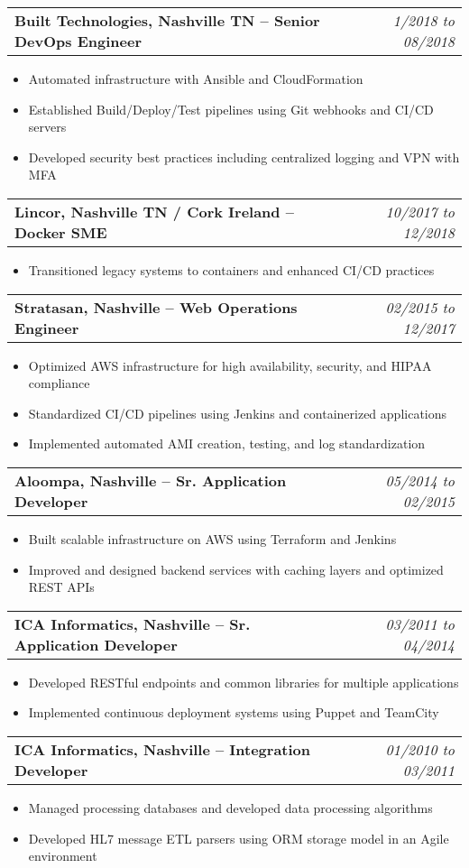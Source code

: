 \documentclass[a4paper,10pt]{article}
\makeatletter
\newcommand{\workentry}[2]{%
  \noindent\begin{tabular*}{\textwidth}{@{\extracolsep{\fill}}lr}
  #1 & \textit{#2} \\
  \end{tabular*}
}
\makeatother
\begin{document}
\workentry{\textbf{Built Technologies, Nashville TN – Senior DevOps Engineer}}{1/2018 to 08/2018}
\begin{itemize}
  \item Automated infrastructure with Ansible and CloudFormation
  \item Established Build/Deploy/Test pipelines using Git webhooks and CI/CD servers
  \item Developed security best practices including centralized logging and VPN with MFA
\end{itemize}

\workentry{\textbf{Lincor, Nashville TN / Cork Ireland – Docker SME}}{10/2017 to 12/2018}
\begin{itemize}
  \item Transitioned legacy systems to containers and enhanced CI/CD practices
\end{itemize}

\workentry{\textbf{Stratasan, Nashville – Web Operations Engineer}}{02/2015 to 12/2017}
\begin{itemize}
  \item Optimized AWS infrastructure for high availability, security, and HIPAA compliance
  \item Standardized CI/CD pipelines using Jenkins and containerized applications
  \item Implemented automated AMI creation, testing, and log standardization
\end{itemize}

\newpage
\workentry{\textbf{Aloompa, Nashville – Sr. Application Developer}}{05/2014 to 02/2015}
\begin{itemize}
  \item Built scalable infrastructure on AWS using Terraform and Jenkins
  \item Improved and designed backend services with caching layers and optimized REST APIs
\end{itemize}

\workentry{\textbf{ICA Informatics, Nashville – Sr. Application Developer}}{03/2011 to 04/2014}
\begin{itemize}
  \item Developed RESTful endpoints and common libraries for multiple applications
  \item Implemented continuous deployment systems using Puppet and TeamCity
\end{itemize}

\workentry{\textbf{ICA Informatics, Nashville – Integration Developer}}{01/2010 to 03/2011}
\begin{itemize}
  \item Managed processing databases and developed data processing algorithms
  \item Developed HL7 message ETL parsers using ORM storage model in an Agile environment
\end{itemize}
\end{document}
